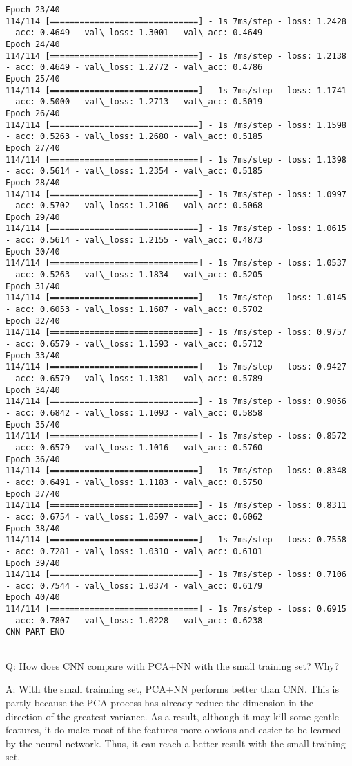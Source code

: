 \documentclass[11pt]{article}
\begin{document}
\begin{Verbatim}[commandchars=\\\{\}]
Epoch 23/40
114/114 [==============================] - 1s 7ms/step - loss: 1.2428 - acc: 0.4649 - val\_loss: 1.3001 - val\_acc: 0.4649
Epoch 24/40
114/114 [==============================] - 1s 7ms/step - loss: 1.2138 - acc: 0.4649 - val\_loss: 1.2772 - val\_acc: 0.4786
Epoch 25/40
114/114 [==============================] - 1s 7ms/step - loss: 1.1741 - acc: 0.5000 - val\_loss: 1.2713 - val\_acc: 0.5019
Epoch 26/40
114/114 [==============================] - 1s 7ms/step - loss: 1.1598 - acc: 0.5263 - val\_loss: 1.2680 - val\_acc: 0.5185
Epoch 27/40
114/114 [==============================] - 1s 7ms/step - loss: 1.1398 - acc: 0.5614 - val\_loss: 1.2354 - val\_acc: 0.5185
Epoch 28/40
114/114 [==============================] - 1s 7ms/step - loss: 1.0997 - acc: 0.5702 - val\_loss: 1.2106 - val\_acc: 0.5068
Epoch 29/40
114/114 [==============================] - 1s 7ms/step - loss: 1.0615 - acc: 0.5614 - val\_loss: 1.2155 - val\_acc: 0.4873
Epoch 30/40
114/114 [==============================] - 1s 7ms/step - loss: 1.0537 - acc: 0.5263 - val\_loss: 1.1834 - val\_acc: 0.5205
Epoch 31/40
114/114 [==============================] - 1s 7ms/step - loss: 1.0145 - acc: 0.6053 - val\_loss: 1.1687 - val\_acc: 0.5702
Epoch 32/40
114/114 [==============================] - 1s 7ms/step - loss: 0.9757 - acc: 0.6579 - val\_loss: 1.1593 - val\_acc: 0.5712
Epoch 33/40
114/114 [==============================] - 1s 7ms/step - loss: 0.9427 - acc: 0.6579 - val\_loss: 1.1381 - val\_acc: 0.5789
Epoch 34/40
114/114 [==============================] - 1s 7ms/step - loss: 0.9056 - acc: 0.6842 - val\_loss: 1.1093 - val\_acc: 0.5858
Epoch 35/40
114/114 [==============================] - 1s 7ms/step - loss: 0.8572 - acc: 0.6579 - val\_loss: 1.1016 - val\_acc: 0.5760
Epoch 36/40
114/114 [==============================] - 1s 7ms/step - loss: 0.8348 - acc: 0.6491 - val\_loss: 1.1183 - val\_acc: 0.5750
Epoch 37/40
114/114 [==============================] - 1s 7ms/step - loss: 0.8311 - acc: 0.6754 - val\_loss: 1.0597 - val\_acc: 0.6062
Epoch 38/40
114/114 [==============================] - 1s 7ms/step - loss: 0.7558 - acc: 0.7281 - val\_loss: 1.0310 - val\_acc: 0.6101
Epoch 39/40
114/114 [==============================] - 1s 7ms/step - loss: 0.7106 - acc: 0.7544 - val\_loss: 1.0374 - val\_acc: 0.6179
Epoch 40/40
114/114 [==============================] - 1s 7ms/step - loss: 0.6915 - acc: 0.7807 - val\_loss: 1.0228 - val\_acc: 0.6238
CNN PART END
------------------

    \end{Verbatim}

    Q: How does CNN compare with PCA+NN with the small training set? Why?

    A: With the small trainning set, PCA+NN performs better than CNN. This
is partly because the PCA process has already reduce the dimension in
the direction of the greatest variance. As a result, although it may
kill some gentle features, it do make most of the features more obvious
and easier to be learned by the neural network. Thus, it can reach a
better result with the small training set.


    
    
    
    
\end{document}
